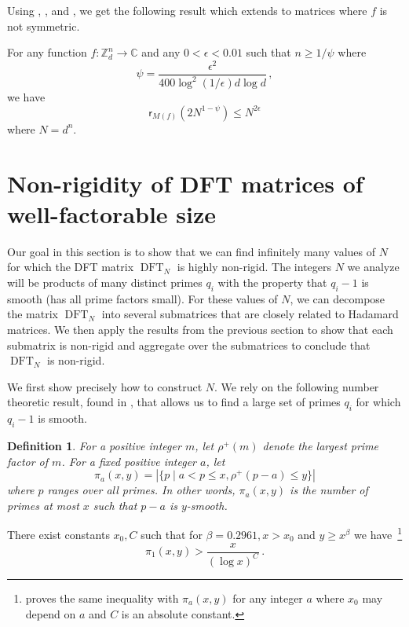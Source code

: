 \documentclass{toc}
\newtheorem{define}[theorem]{Definition}
\renewcommand\Z{{\mathbb{Z}}}
\renewcommand\C{{\mathbb{C}}}
\DeclareMathOperator{\DFT}{DFT}
\begin{document}
Using , , and , we get the following result which extends  to matrices where $f$ is not symmetric.
\begin{corollary}\label{groupalgebra1}
For any function $f: \Z_d^n \rightarrow \C$ and any $0 < \epsilon < 0.01$ such that $n \geq 1/ \psi$ where 
\[\psi = \frac{\epsilon^2 }{400\log^2 (1/\epsilon) d \log d} \,,\]
 we have 
\[
\textsf{r}_{M(f)}\left(2N^{1 - \psi}\right) \leq N^{ 2\epsilon}
\]
where $N = d^n$.
\end{corollary}

\section{Non-rigidity of  %
DFT matrices of well-factorable size} %
\label{sec_Fourier1}
Our goal in this section is to show that we can find infinitely many values of $N$ for which the %
DFT %
 matrix %
$\DFT_N$ %
 is highly non-rigid.  The integers $N$ we analyze will be products of many distinct primes $q_i$ with the property that $q_i - 1$ is
%
smooth (has all prime factors small).  For these values of $N$, we can decompose the matrix %
$\DFT_N$ %
 into several submatrices that are closely related to Hadamard matrices.  We then apply the results from the previous section to show that each submatrix is non-rigid and aggregate over the submatrices to conclude that %
$\DFT_N$ %
 is non-rigid.

We first show precisely how to construct $N$.  We rely on the following number theoretic result, found in \cite{smooth_primes}, that allows us to find a large set of primes $q_i$ for which $q_i - 1$ is %
%
smooth. 
\begin{define}
For a positive integer $m$, let $\rho^+(m)$ denote the largest prime factor of $m$.  For a fixed positive integer $a$, let
%
%
%
%
$$
\pi_a(x,y) = |\{p \mid a<p \leq x, \rho^+(p-a) \leq y\} |
$$
%
where $p$ ranges over all primes.  In other words, $\pi_a(x,y)$ is the number of primes at most $x$ such that $p-a$ is $y$-smooth.
\end{define}
\begin{theorem}\label{analytic_NT}
There exist constants $x_0,C$ such that for $\beta = 0.2961, x > x_0$ and $y \geq x^{\beta}$ we have~\footnote{\cite{smooth_primes} proves the same inequality with $\pi_a(x,y)$ for any integer $a$ where $x_0$ may depend on $a$ and $C$ is an absolute constant.}
$$
\pi_1(x,y) > \frac{x}{(\log x)^C}\,.
$$

\end{theorem}
\end{document}

